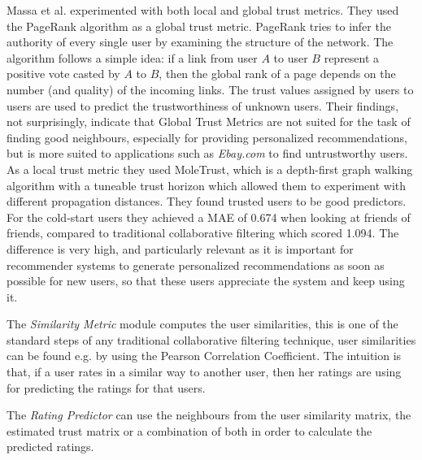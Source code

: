 Massa et al. \cite{Massa2007} experimented with both local and global trust
metrics. They used the PageRank algorithm as a global trust metric. PageRank
tries to infer the authority of every single user by examining the structure of
the network. The algorithm follows a simple idea: if a link from user $A$ to
user $B$ represent a positive vote casted by $A$ to $B$, then the global rank
of a page depends on the number (and quality) of the incoming links. The trust
values assigned by users to users are used to predict the trustworthiness of
unknown users. Their findings, not surprisingly, indicate that Global Trust
Metrics are not suited for the task of finding good neighbours, especially for
providing personalized recommendations, but is more suited to applications such
as \emph{Ebay.com} to find untrustworthy users. As a local trust metric they
used MoleTrust, which is a depth-first graph walking algorithm with a tuneable
trust horizon which allowed them to experiment with different propagation
distances. They found trusted users to be good predictors. For the cold-start
users they achieved a MAE of 0.674 when looking at friends of friends, compared
to traditional collaborative filtering which scored 1.094. The difference is
very high, and particularly relevant as it is important for recommender systems
to generate personalized recommendations as soon as possible for new users, so
that these users appreciate the system and keep using it.

The \emph{Similarity Metric} module computes the user similarities, this is one
of the standard steps of any traditional collaborative filtering technique,
user similarities can be found e.g. by using the Pearson Correlation
Coefficient. The intuition is that, if a user rates in a similar way to another
user, then her ratings are using for predicting the ratings for that users.

The \emph{Rating Predictor} can use the neighbours from the user similarity
matrix, the estimated trust matrix or a combination of both in order to
calculate the predicted ratings.


